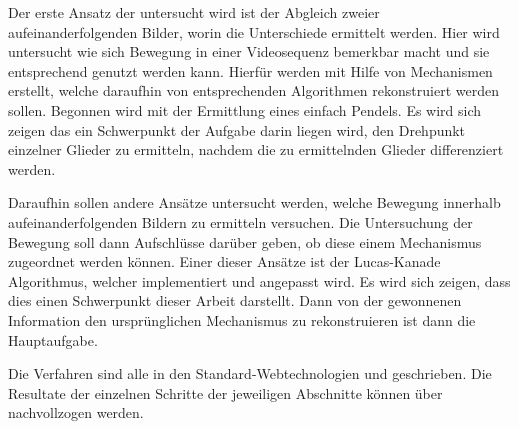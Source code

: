 Der erste Ansatz der untersucht wird ist der Abgleich zweier aufeinanderfolgenden Bilder, worin die Unterschiede ermittelt werden.
Hier wird untersucht wie sich Bewegung in einer Videosequenz bemerkbar macht und sie entsprechend genutzt werden kann.
Hierfür werden mit Hilfe von  Mechanismen erstellt, welche daraufhin von entsprechenden Algorithmen rekonstruiert werden sollen.
Begonnen wird mit der Ermittlung eines einfach Pendels.
Es wird sich zeigen das ein Schwerpunkt der Aufgabe darin liegen wird, den Drehpunkt einzelner Glieder zu ermitteln, nachdem die zu ermittelnden Glieder differenziert werden.

Daraufhin sollen andere Ansätze untersucht werden, welche Bewegung innerhalb aufeinanderfolgenden Bildern zu ermitteln versuchen.
Die Untersuchung der Bewegung soll dann Aufschlüsse darüber geben, ob diese einem Mechanismus zugeordnet werden können.
Einer dieser Ansätze ist der Lucas-Kanade Algorithmus, welcher implementiert und angepasst wird. %
Es wird sich zeigen, dass dies einen Schwerpunkt dieser Arbeit darstellt.
Dann von der gewonnenen Information den ursprünglichen Mechanismus zu rekonstruieren ist dann die Hauptaufgabe.

Die Verfahren sind alle in den Standard-Webtechnologien  und  geschrieben.
Die Resultate der einzelnen Schritte der jeweiligen Abschnitte können über  nachvollzogen werden.
